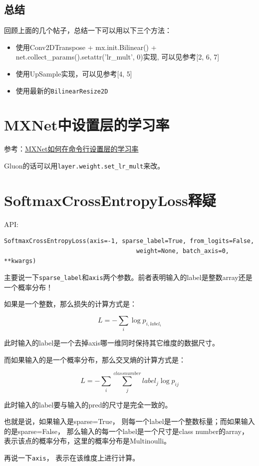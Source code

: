 \subsection{总结}

回顾上面的几个帖子，总结一下可以用以下三个方法：
\begin{itemize}
\item 使用Conv2DTranspose + mx.init.Bilinear() + net.collect\_params().setattr('lr\_mult', 0)实现, 可以见参考[2, 6, 7]
\item 使用UpSample实现，可以见参考[4, 5]
\item 使用最新的\verb|BilinearResize2D|
\end{itemize}


\section{MXNet中设置层的学习率}

参考：\href{https://discuss.gluon.ai/t/topic/6636}{MXNet如何在命令行设置层的学习率}

Gluon的话可以用\verb|layer.weight.set_lr_mult|来改。

\section{SoftmaxCrossEntropyLoss释疑}

API:

\begin{verbatim}
SoftmaxCrossEntropyLoss(axis=-1, sparse_label=True, from_logits=False, 
									 weight=None, batch_axis=0, **kwargs)
\end{verbatim}

主要说一下\verb|sparse_label|和\verb|axis|两个参数。前者表明输入的label是整数array还是一个概率分布！

如果是一个整数，那么损失的计算方式是：

\begin{displaymath}
L = - \sum_{i}\log p_{i, label_i}
\end{displaymath}

此时输入的label是一个去掉axis哪一维同时保持其它维度的数据尺寸。

而如果输入的是一个概率分布，那么交叉熵的计算方式是：

\begin{displaymath}
L = - \sum_{i} \sum_{j}^{class number} label_j \log p_{ij}
\end{displaymath}

此时输入的label要与输入的pred的尺寸是完全一致的。

也就是说，如果输入是sparse=True， 则每一个label是一个整数标量；而如果输入的是sparse=False， 那么输入的每一个label是一个尺寸是class number的array， 表示该点的概率分布，这里的概率分布是Multinoulli。

再说一下\verb|axis|， 表示在该维度上进行计算。












